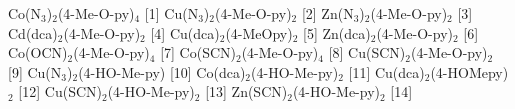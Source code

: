 Co(N$_3$)$_2$(4-Me-O-py)$_4$ [1]
Cu(N$_3$)$_2$(4-Me-O-py)$_2$ [2]
Zn(N$_3$)$_2$(4-Me-O-py)$_2$ [3]
Cd(dca)$_2$(4-Me-O-py)$_2$ [4]
Cu(dca)$_2$(4-MeOpy)$_2$ [5]
Zn(dca)$_2$(4-Me-O-py)$_2$ [6]
Co(OCN)$_2$(4-Me-O-py)$_4$ [7]
Co(SCN)$_2$(4-Me-O-py)$_4$ [8]
Cu(SCN)$_2$(4-Me-O-py)$_2$ [9]
Cu(N$_3$)$_2$(4-HO-Me-py) [10]
Co(dca)$_2$(4-HO-Me-py)$_2$ [11]
Cu(dca)$_2$(4-HOMepy)$_2$ [12]
Cu(SCN)$_2$(4-HO-Me-py)$_2$ [13]
Zn(SCN)$_2$(4-HO-Me-py)$_2$ [14]